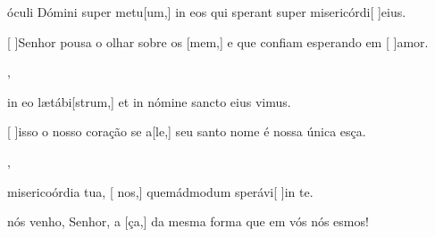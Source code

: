 {  {\item {} óculi Dómini super metu[um,] in eos qui sperant super misericórdi[ ]{e}ius.}%
    {\item {}[ ]{Se}nhor pousa o olhar sobre os [mem,] e que confiam esperando em [ ]{a}mor.},
  {\item {} in eo lætábi[strum,] et in nómine sancto eius vimus.}%
    {\item {}[ ]{is}so o nosso coração se a[le,] seu santo nome é nossa única esça.},
  {\item {} misericoórdia tua, [ nos,] quemádmodum sperávi[ ]{in} te.}%
    {\item {} nós venho, Senhor, a [ça,] da mes\-ma forma que em vós nós esmos!}
}